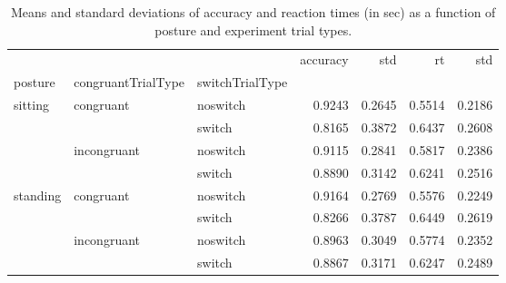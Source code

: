 \begin{table}
\centering
\caption{Means and standard deviations of accuracy and reaction times (in sec) as a function of posture and experiment trial types.}
\label{table-task-switching-replication-reaction-time}
\begin{tabular}{lllrrrr}
\toprule
         &             &        & accuracy &    std &     rt &    std \\
posture & congruantTrialType & switchTrialType &          &        &        &        \\
\midrule
sitting & congruant & noswitch &   0.9243 & 0.2645 & 0.5514 & 0.2186 \\
         &             & switch &   0.8165 & 0.3872 & 0.6437 & 0.2608 \\
         & incongruant & noswitch &   0.9115 & 0.2841 & 0.5817 & 0.2386 \\
         &             & switch &   0.8890 & 0.3142 & 0.6241 & 0.2516 \\
standing & congruant & noswitch &   0.9164 & 0.2769 & 0.5576 & 0.2249 \\
         &             & switch &   0.8266 & 0.3787 & 0.6449 & 0.2619 \\
         & incongruant & noswitch &   0.8963 & 0.3049 & 0.5774 & 0.2352 \\
         &             & switch &   0.8867 & 0.3171 & 0.6247 & 0.2489 \\
\bottomrule
\end{tabular}
\end{table}

